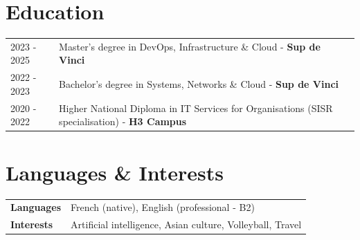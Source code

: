 \documentclass[a4paper,10pt]{article}
\begin{document}
\section{Education}
\begin{tabularx}{\linewidth}{@{}l X@{}}
2023 - 2025 & Master's degree in DevOps, Infrastructure \& Cloud - \textbf{Sup de Vinci} \\
2022 - 2023 & Bachelor's degree in Systems, Networks \& Cloud - \textbf{Sup de Vinci} \\
2020 - 2022 & Higher National Diploma in IT Services for Organisations (SISR specialisation) - \textbf{H3 Campus} \\
\end{tabularx}

\vspace{3pt}

\section{Languages \& Interests}
\begin{tabularx}{\linewidth}{@{}l X@{}}
\textbf{Languages} & French (native), English (professional - B2)\\
\textbf{Interests} & Artificial intelligence, Asian culture, Volleyball, Travel\\
\end{tabularx}
\end{document}
